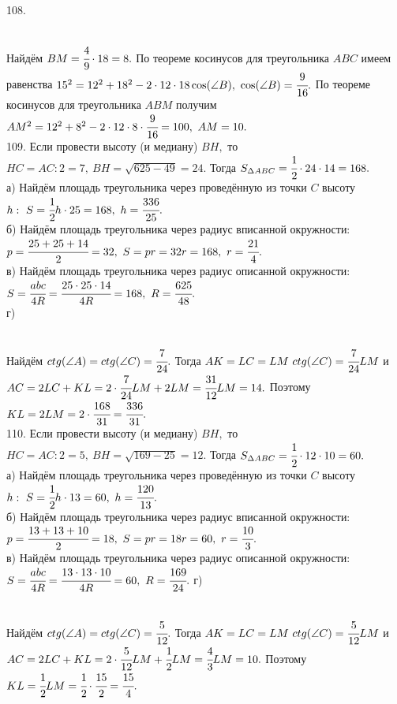 108. \begin{figure}[ht!]
\end{figure}\\
Найдём $BM=\cfrac{4}{9}\cdot18=8.$ По теореме косинусов для треугольника $ABC$ имеем равенства $15^2=12^2+18^2-2\cdot12\cdot18\cos(\angle B),\ \cos(\angle B)=\cfrac{9}{16}.$ По теореме косинусов для треугольника $ABM$ получим $AM^2=12^2+8^2-2\cdot12\cdot8\cdot\cfrac{9}{16}=100,\ AM=10.$\\
109. Если провести высоту (и медиану) $BH,$ то $HC=AC:2=7,\ BH=\sqrt{625-49}=24.$ Тогда $S_{\Delta ABC}=\cfrac{1}{2}\cdot24\cdot14=168.$\\
а) Найдём площадь треугольника через проведённую из точки $C$ высоту $h:\ S=\cfrac{1}{2}h\cdot25=168,\ h=\cfrac{336}{25}.$\\
б) Найдём площадь треугольника через радиус вписанной окружности: $p=\cfrac{25+25+14}{2}=32,\ S=pr=32r=168,\ r=\cfrac{21}{4}.$\\
в) Найдём площадь треугольника через радиус описанной окружности: $S=\cfrac{abc}{4R}=\cfrac{25\cdot25\cdot14}{4R}=168,\ R=\cfrac{625}{48}.$\\
г) \begin{figure}[ht!]
\end{figure}\\
Найдём $ctg(\angle A)=ctg(\angle C)=\cfrac{7}{24}.$ Тогда $AK=LC=LM\ ctg(\angle C)=\cfrac{7}{24}LM$ и $AC=2LC+KL=2\cdot\cfrac{7}{24}LM+2LM=\cfrac{31}{12}LM=14.$ Поэтому $KL=2LM=2\cdot\cfrac{168}{31}=\cfrac{336}{31}.$\\
110. Если провести высоту (и медиану) $BH,$ то $HC=AC:2=5,\ BH=\sqrt{169-25}=12.$ Тогда $S_{\Delta ABC}=\cfrac{1}{2}\cdot12\cdot10=60.$\\
а) Найдём площадь треугольника через проведённую из точки $C$ высоту $h:\ S=\cfrac{1}{2}h\cdot13=60,\ h=\cfrac{120}{13}.$\\
б) Найдём площадь треугольника через радиус вписанной окружности: $p=\cfrac{13+13+10}{2}=18,\ S=pr=18r=60,\ r=\cfrac{10}{3}.$\\
в) Найдём площадь треугольника через радиус описанной окружности: $S=\cfrac{abc}{4R}=\cfrac{13\cdot13\cdot10}{4R}=60,\ R=\cfrac{169}{24}.$\newpage\noindent
г) \begin{figure}[ht!]
\end{figure}\\
Найдём $ctg(\angle A)=ctg(\angle C)=\cfrac{5}{12}.$ Тогда $AK=LC=LM\ ctg(\angle C)=\cfrac{5}{12}LM$ и $AC=2LC+KL=2\cdot\cfrac{5}{12}LM+\cfrac{1}{2}LM=\cfrac{4}{3}LM=10.$ Поэтому $KL=\cfrac{1}{2}LM=\cfrac{1}{2}\cdot\cfrac{15}{2}=\cfrac{15}{4}.$\\
